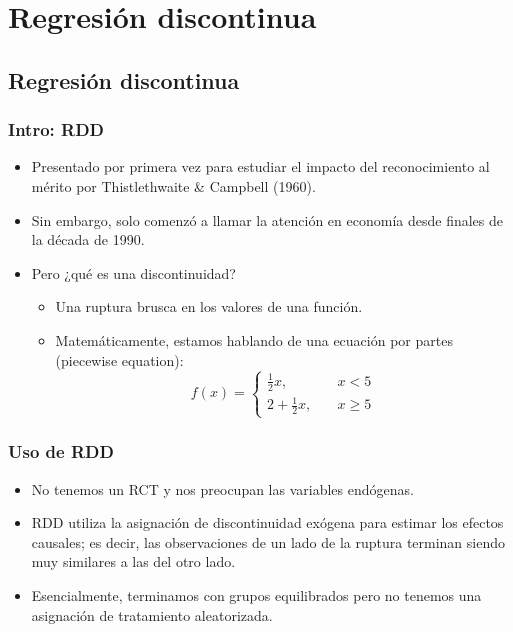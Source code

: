 \documentclass[10pt, aspectratio=169, compress]{beamer}
\begin{document}
\section{Regresión discontinua}
\subsection{Regresión discontinua}
\begin{frame}
	\frametitle{Intro: RDD}

	\begin{itemize}
		\item Presentado por primera vez para estudiar el impacto del reconocimiento al mérito por Thistlethwaite \& Campbell (1960).
		\item Sin embargo, solo comenzó a llamar la atención en economía desde finales de la década de 1990.
		\item Pero ¿qué es una discontinuidad?
		\begin{itemize}
			\item Una ruptura brusca en los valores de una función.
			\item Matemáticamente, estamos hablando de una ecuación por partes (piecewise equation):
			$$
			f(x) = \left\{
			\begin{array}{ll}
			\frac{1}{2} x, 	& \quad x < 5 \\
			2+\frac{1}{2}x,  & \quad x \geq 5
			\end{array}
			\right.
			$$
		\end{itemize}
	\end{itemize}
\end{frame}
\begin{frame}
	\frametitle{Uso de RDD}

	\begin{itemize}
		\item No tenemos un RCT y nos preocupan las variables endógenas.
		\item RDD utiliza la asignación de discontinuidad exógena para estimar los efectos causales; es decir, las observaciones de un lado de la ruptura terminan siendo muy similares a las del otro lado.
		\item Esencialmente, terminamos con grupos equilibrados pero no tenemos una asignación de tratamiento aleatorizada.
	\end{itemize}

\end{frame}
\end{document}
